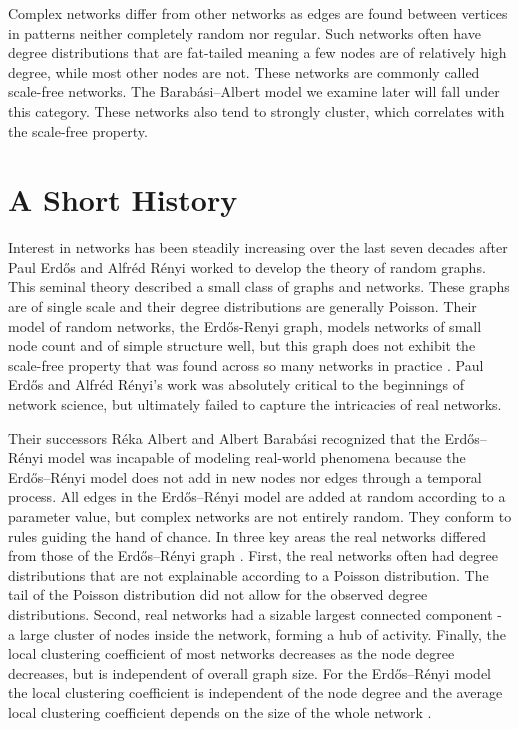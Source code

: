 Complex networks differ from other networks as edges are found between vertices 
in patterns neither completely random nor regular. Such networks often have degree distributions that are fat-tailed
meaning a few nodes are of relatively high degree, while most other nodes are not. These networks
are commonly called scale-free networks. The Barabási–Albert model we examine later will fall under
this category. These networks also tend to strongly cluster, which correlates with the scale-free 
property. 

\section{A Short History}

Interest in networks has been steadily increasing over the last seven decades after
Paul Erdős and Alfréd Rényi worked to develop the theory of random graphs. This 
seminal theory described a small class of graphs and networks. These graphs are of single scale
and their degree distributions are generally Poisson. Their model of 
random networks, the Erdős-Renyi graph, models networks of small node count
and of simple structure well, but this graph does not exhibit the scale-free property that was found across so many networks
in practice \cite{barabasi2016network}. Paul Erdős and Alfréd Rényi's work
was absolutely critical to the beginnings of network science, but ultimately failed to 
capture the intricacies of real networks. 


Their successors Réka Albert and Albert Barabási recognized that the Erdős–Rényi model 
was incapable of modeling real-world phenomena because the Erdős–Rényi model does not add
in new nodes nor edges through a temporal process. All edges in the Erdős–Rényi model are added at random
according to a parameter value, but complex networks are not entirely random.
They conform to rules guiding the hand of chance. 
In three key areas the real networks differed from those
of the Erdős–Rényi graph \cite{barabasi2016network}.
 First, the real networks often had degree distributions 
that are not explainable according to a Poisson distribution.
 The tail of the Poisson
distribution did not allow for the observed degree distributions.
Second, real networks had a sizable largest connected component - a large cluster 
of nodes inside the network, forming a hub of activity.
 Finally, the local clustering coefficient of most networks
decreases as the node degree decreases,
 but is independent of overall graph size. For the Erdős–Rényi model
the local clustering coefficient is independent of the node degree and the average local clustering coefficient
depends on the size of the whole network \cite{barabasi2016network}.


